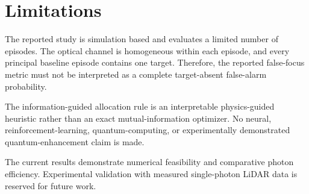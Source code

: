 \section*{Limitations}

The reported study is simulation based and evaluates a limited number of
episodes. The optical channel is homogeneous within each episode, and every
principal baseline episode contains one target. Therefore, the reported
false-focus metric must not be interpreted as a complete target-absent
false-alarm probability.

The information-guided allocation rule is an interpretable physics-guided
heuristic rather than an exact mutual-information optimizer. No neural,
reinforcement-learning, quantum-computing, or experimentally demonstrated
quantum-enhancement claim is made.

The current results demonstrate numerical feasibility and comparative photon
efficiency. Experimental validation with measured single-photon LiDAR data
is reserved for future work.
